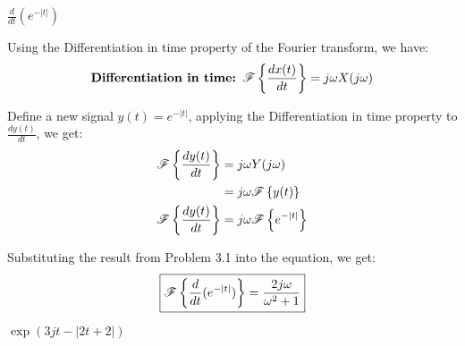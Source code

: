 \documentclass[a4paper, 10pt]{article}
\begin{document}
\begin{subsubproblems}[start=1]
    \item \( \frac{d}{dt} (e^{-|t|}) \)
\end{subsubproblems}

\begin{solution}
Using the Differentiation in time property of the Fourier transform, we have:
\[
    \textbf{Differentiation in time: } \mathscr{F} \left\{ \frac{d x(t)}{dt} \right\} = j\omega X(j\omega)
\]

Define a new signal \( y(t) = e^{-|t|} \), applying the Differentiation in time property to \( \frac{d y(t)}{dt} \), we get:
\begin{align*}  
    \mathscr{F} \left\{ \frac{d y(t)}{dt} \right\} &= j\omega Y(j\omega) \\
    &= j\omega \mathscr{F} \left\{ y(t) \right\} \\
    \mathscr{F} \left\{ \frac{d y(t)}{dt} \right\} &= j\omega \mathscr{F} \left\{ e^{-|t|} \right\}
\end{align*}

Substituting the result from Problem 3.1 into the equation, we get:
\[ \boxed{
    \mathscr{F} \left\{ \frac{d}{dt} (e^{-|t|}) \right\} = \frac{2j\omega}{\omega^2 + 1}
} \]
\end{solution}

\newpage

\begin{subsubproblems}[start=2]
    \item \( \exp(3jt-|2t+2|) \)
\end{subsubproblems}
\end{document}
